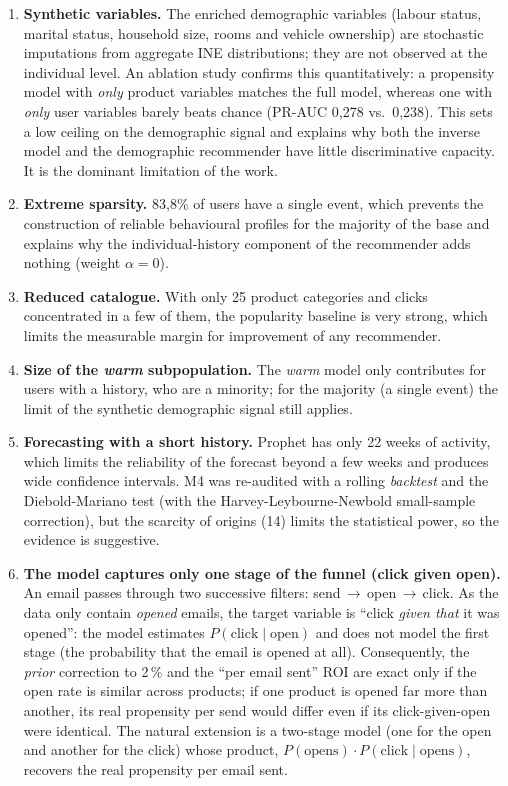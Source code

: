 \begin{enumerate}
    \item \textbf{Synthetic variables.} The enriched demographic variables (labour status, marital status, household size, rooms and vehicle ownership) are stochastic imputations from aggregate INE distributions; they are not observed at the individual level. An ablation study confirms this quantitatively: a propensity model with \emph{only} product variables matches the full model, whereas one with \emph{only} user variables barely beats chance (PR-AUC 0,278 vs.\ 0,238). This sets a low ceiling on the demographic signal and explains why both the inverse model and the demographic recommender have little discriminative capacity. It is the dominant limitation of the work.

    \item \textbf{Extreme sparsity.} 83,8\% of users have a single event, which prevents the construction of reliable behavioural profiles for the majority of the base and explains why the individual-history component of the recommender adds nothing (weight $\alpha=0$).

    \item \textbf{Reduced catalogue.} With only 25 product categories and clicks concentrated in a few of them, the popularity baseline is very strong, which limits the measurable margin for improvement of any recommender.

    \item \textbf{Size of the \textit{warm} subpopulation.} The \emph{warm} model only contributes for users with a history, who are a minority; for the majority (a single event) the limit of the synthetic demographic signal still applies.

    \item \textbf{Forecasting with a short history.} Prophet has only 22 weeks of activity, which limits the reliability of the forecast beyond a few weeks and produces wide confidence intervals. M4 was re-audited with a rolling \textit{backtest} and the Diebold-Mariano test (with the Harvey-Leybourne-Newbold small-sample correction), but the scarcity of origins (14) limits the statistical power, so the evidence is suggestive.

    \item \textbf{The model captures only one stage of the funnel (click given open).} An email passes through two successive filters: send\,$\rightarrow$\,open\,$\rightarrow$\,click. As the data only contain \emph{opened} emails, the target variable is ``click \emph{given that} it was opened'': the model estimates $P(\text{click}\mid\text{open})$ and does not model the first stage (the probability that the email is opened at all). Consequently, the \textit{prior} correction to 2\,\% and the ``per email sent'' ROI are exact only if the open rate is similar across products; if one product is opened far more than another, its real propensity per send would differ even if its click-given-open were identical. The natural extension is a two-stage model (one for the open and another for the click) whose product, $P(\text{opens})\cdot P(\text{click}\mid\text{opens})$, recovers the real propensity per email sent.
\end{enumerate}

